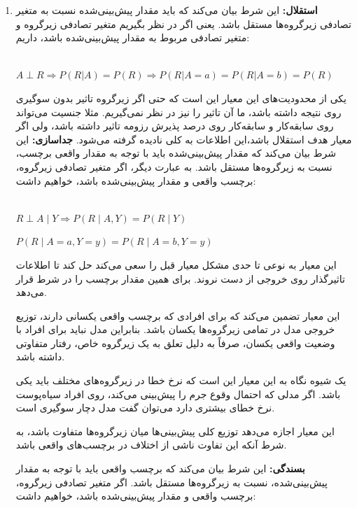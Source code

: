 \begin{enumerate}
	\item 
	\textbf{استقلال:}
	این شرط بیان می‌کند که باید مقدار پیش‌بینی‌شده نسبت به متغیر تصادفی زیرگروه‌ها مستقل باشد. یعنی اگر در نظر بگیریم 
	متغیر تصادفی زیرگروه و 
	متغیر تصادفی مربوط به مقدار پیش‌بینی‌شده باشد، داریم:
	\begin{latin}
		~\\
		$
		A \perp R \Rightarrow P(R | A) = P(R) \Rightarrow P(R | A = a) = P(R | A = b) = P(R)
		$
	\end{latin}
	یکی از محدودیت‌های این معیار این است که حتی اگر زیرگروه 
	تاثیر بدون سوگیری روی نتیجه داشته باشد، ما آن تاثیر را نیز در نظر نمی‌گیریم. مثلا جنسیت می‌تواند روی سابقه‌کار و سابقه‌کار روی درصد پذیرش رزومه تاثیر داشته باشد، ولی اگر  معیار هدف استقلال باشد،‌این اطلاعات به کلی نادیده گرفته می‌شود. 
	\textbf{جداسازی:}
	این شرط بیان می‌کند که مقدار پیش‌بینی‌شده باید با توجه به مقدار واقعی برچسب، نسبت به زیرگروه‌ها مستقل باشد. به عبارت دیگر، اگر
	متغیر تصادفی زیرگروه،
	برچسب واقعی و
	مقدار پیش‌بینی‌شده باشد، خواهیم داشت:
	
	\begin{latin}
		~\\
		$
		R \perp A \mid Y
		\Rightarrow
		P(R \mid A,Y)=P(R\mid Y)
		$
		
		$
		P(R\mid A=a,Y=y)=P(R\mid A=b,Y=y)
		$
	\end{latin}
	
	این معیار به نوعی تا حدی مشکل معیار قبل را سعی می‌کند حل کند تا اطلاعات تاثیرگذار روی خروجی از دست نروند. برای همین مقدار برچسب را در شرط قرار می‌دهد.
	
	این معیار تضمین می‌کند که برای افرادی که برچسب واقعی یکسانی دارند، توزیع خروجی مدل در تمامی زیرگروه‌ها یکسان باشد. بنابراین مدل نباید برای افراد با وضعیت واقعی یکسان، صرفاً به دلیل تعلق به یک زیرگروه خاص، رفتار متفاوتی داشته باشد. 
	
	یک شیوه نگاه به این معیار این است که نرخ خطا در زیرگروه‌های مختلف باید یکی باشد. اگر مدلی که احتمال وقوع جرم را پیش‌بینی می‌کند، روی افراد سیاه‌پوست نرخ خطای بیشتری دارد می‌توان گفت مدل دچار سوگیری است. 
	
	این معیار اجازه می‌دهد توزیع کلی پیش‌بینی‌ها میان زیرگروه‌ها متفاوت باشد، به شرط آنکه این تفاوت ناشی از اختلاف در برچسب‌های واقعی باشد.
	
	\vspace{0.5cm}
	
	\textbf{بسندگی:}
	این شرط بیان می‌کند که برچسب واقعی باید با توجه به مقدار پیش‌بینی‌شده، نسبت به زیرگروه‌ها مستقل باشد. اگر
	متغیر تصادفی زیرگروه،
	برچسب واقعی و
	مقدار پیش‌بینی‌شده باشد، خواهیم داشت:
	

\end{enumerate}

